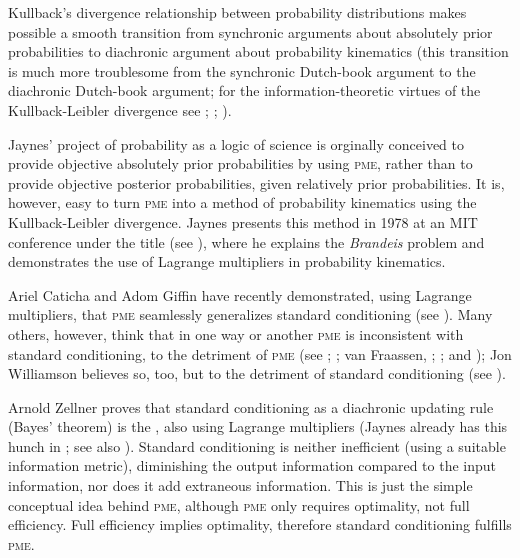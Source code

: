 \documentclass[phd,12pt,oneside]{ubcthesis}
\begin{document}
Kullback's divergence relationship between probability distributions
makes possible a smooth transition from synchronic arguments about
absolutely prior probabilities to diachronic argument about
probability kinematics (this transition is much more troublesome from
the synchronic Dutch-book argument to the diachronic Dutch-book
argument; for the information-theoretic virtues of the
Kullback-Leibler divergence see ;
; ).

Jaynes' project of probability as a logic of science is orginally
conceived to provide objective absolutely prior probabilities by using
\textsc{pme}, rather than to provide objective posterior
probabilities, given relatively prior probabilities. It is, however,
easy to turn \textsc{pme} into a method of probability kinematics
using the Kullback-Leibler divergence. Jaynes presents this method in
1978 at an MIT conference under the title  (see ), where he explains
the \emph{Brandeis} problem and demonstrates the use of Lagrange
multipliers in probability kinematics.

Ariel Caticha and Adom Giffin have recently demonstrated, using
Lagrange multipliers, that \textsc{pme} seamlessly generalizes
standard conditioning (see ). Many others,
however, think that in one way or another \textsc{pme} is
inconsistent with standard conditioning, to the detriment of
\textsc{pme} (see ;
; van Fraassen, ;
; and ); Jon
Williamson believes so, too, but to the detriment of standard
conditioning (see ).

Arnold Zellner proves that standard conditioning as a diachronic
updating rule (Bayes' theorem) is the  , also using Lagrange
multipliers (Jaynes already has this hunch in
; see also ).
Standard conditioning is neither inefficient (using a suitable
information metric), diminishing the output information compared to
the input information, nor does it add extraneous information. This is
just the simple conceptual idea behind \textsc{pme}, although
\textsc{pme} only requires optimality, not full efficiency. Full
efficiency implies optimality, therefore standard conditioning
fulfills \textsc{pme}.
\end{document}
